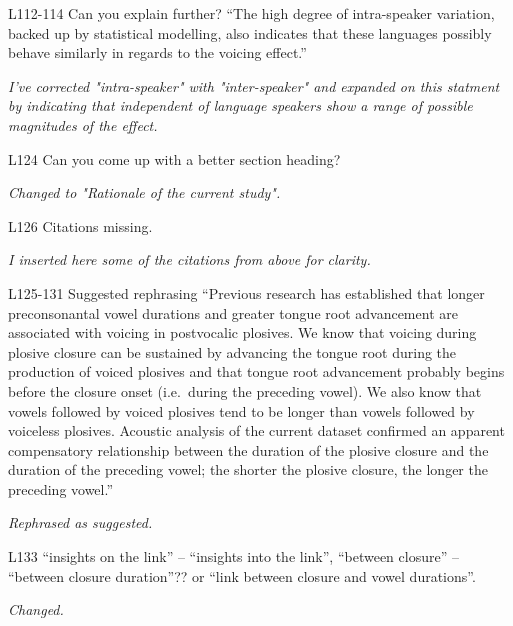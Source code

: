 \documentclass[]{article}
\begin{document}
L112-114 Can you explain further? ``The high degree of intra-speaker
variation, backed up by statistical modelling, also indicates that these
languages possibly behave similarly in regards to the voicing effect.''

\begin{adjustwidth}{1cm}{} \textit{
I've corrected "intra-speaker" with "inter-speaker" and expanded on this statment by indicating that independent of language speakers show a range of possible magnitudes of the effect.
} \end{adjustwidth}

L124 Can you come up with a better section heading?

\begin{adjustwidth}{1cm}{} \textit{
Changed to "Rationale of the current study".
} \end{adjustwidth}

L126 Citations missing.

\begin{adjustwidth}{1cm}{} \textit{
I inserted here some of the citations from above for clarity.
} \end{adjustwidth}

L125-131 Suggested rephrasing ``Previous research has established that
longer preconsonantal vowel durations and greater tongue root
advancement are associated with voicing in postvocalic plosives. We know
that voicing during plosive closure can be sustained by advancing the
tongue root during the production of voiced plosives and that tongue
root advancement probably begins before the closure onset (i.e.~during
the preceding vowel). We also know that vowels followed by voiced
plosives tend to be longer than vowels followed by voiceless plosives.
Acoustic analysis of the current dataset confirmed an apparent
compensatory relationship between the duration of the plosive closure
and the duration of the preceding vowel; the shorter the plosive
closure, the longer the preceding vowel.''

\begin{adjustwidth}{1cm}{} \textit{
Rephrased as suggested.
} \end{adjustwidth}

L133 ``insights on the link'' -- ``insights into the link'', ``between
closure'' -- ``between closure duration''?? or ``link between closure
and vowel durations''.

\begin{adjustwidth}{1cm}{} \textit{
Changed.
} \end{adjustwidth}
\end{document}
